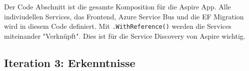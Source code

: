             Der Code Abschnitt ist die gesamte Komposition für die Aspire App. Alle indiviudellen Services, das Frontend, Azure Service Bus und die EF Migration wird in diesem Code definiert. Mit \verb|.WithReference()| werden die Services miteinander "Verknüpft". Dies ist für die Service Discovery von Aspire wichtig.

            

    \subsection{Iteration 3: Erkenntnisse}



